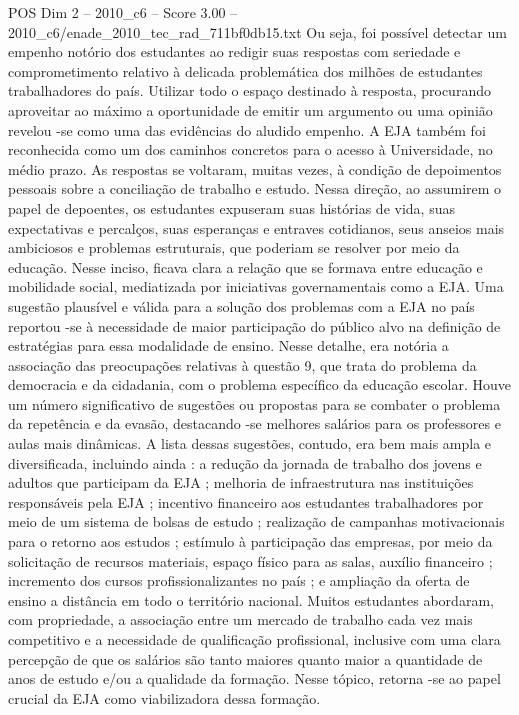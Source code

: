 \begin{textsample}{POS Dim 2 – 2010\_c6 – Score 3.00 – 2010\_c6/enade\_2010\_tec\_rad\_711bf0db15.txt}
Ou seja, foi possível detectar um empenho notório dos estudantes ao redigir suas respostas com seriedade e comprometimento relativo à delicada problemática dos milhões de estudantes trabalhadores do país.
Utilizar todo o espaço destinado à resposta, procurando aproveitar ao máximo a oportunidade de emitir um argumento ou uma opinião revelou -se como uma das evidências do aludido empenho.
A EJA também foi reconhecida como um dos caminhos concretos para o acesso à Universidade, no médio prazo.
As respostas se voltaram, muitas vezes, à condição de depoimentos pessoais sobre a conciliação de trabalho e estudo.
Nessa direção, ao assumirem o papel de depoentes, os estudantes expuseram suas histórias de vida, suas expectativas e percalços, suas esperanças e entraves cotidianos, seus anseios mais ambiciosos e problemas estruturais, que poderiam se resolver por meio da educação.
Nesse inciso, ficava clara a relação que se formava entre educação e mobilidade social, mediatizada por iniciativas governamentais como a EJA.
Uma sugestão plausível e válida para a solução dos problemas com a EJA no país reportou -se à necessidade de maior participação do público alvo na definição de estratégias para essa modalidade de ensino.
Nesse detalhe, era notória a associação das preocupações relativas à questão 9, que trata do problema da democracia e da cidadania, com o problema específico da educação escolar.
Houve um número significativo de sugestões ou propostas para se combater o problema da repetência e da evasão, destacando -se melhores salários para os professores e aulas mais dinâmicas.
A lista dessas sugestões, contudo, era bem mais ampla e diversificada, incluindo ainda : a redução da jornada de trabalho dos jovens e adultos que participam da EJA ; melhoria de infraestrutura nas instituições responsáveis pela EJA ; incentivo financeiro aos estudantes trabalhadores por meio de um sistema de bolsas de estudo ; realização de campanhas motivacionais para o retorno aos estudos ; estímulo à participação das empresas, por meio da solicitação de recursos materiais, espaço físico para as salas, auxílio financeiro ; incremento dos cursos profissionalizantes no país ; e ampliação da oferta de ensino a distância em todo o território nacional.
Muitos estudantes abordaram, com propriedade, a associação entre um mercado de trabalho cada vez mais competitivo e a necessidade de qualificação profissional, inclusive com uma clara percepção de que os salários são tanto maiores quanto maior a quantidade de anos de estudo e/ou a qualidade da formação.
Nesse tópico, retorna -se ao papel crucial da EJA como viabilizadora dessa formação.

\end{textsample}

